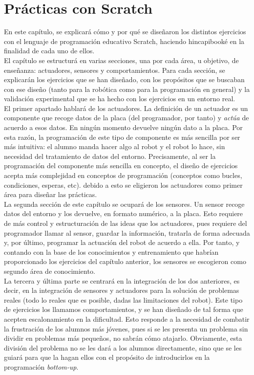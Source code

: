 \chapter{Prácticas con Scratch}
\label{cap:scratch}
En este capítulo, se explicará cómo y por qué se diseñaron los distintos ejercicios con el lenguaje de programación educativo Scratch, haciendo hincapibooké en la finalidad de cada uno de ellos. \\
El capítulo se estructurá en varias secciones, una por cada área, u objetivo, de enseñanza: actuadores, sensores y comportamientos. Para cada sección, se explicarán los ejercicios que se han diseñado, con los propósitos que se buscaban con ese diseño (tanto para la robótica como para la programación en general) y la validación experimental que se ha hecho con los ejercicios en un entorno real.\\
El primer apartado hablará de los actuadores. La definición de un actuador es un componente que recoge datos de la placa (del programador, por tanto) y \textit{actúa} de acuerdo a esos datos. En ningún momento devuelve ningún dato a la placa. Por esta razón, la programación de este tipo de componente es más sencilla por ser más intuitiva: el alumno manda hacer algo al robot y el robot lo hace, sin necesidad del tratamiento de datos del entorno. Precisamente, al ser la programación del componente más sencilla en concepto, el diseño de ejercicios acepta más complejidad en conceptos de programación (conceptos como bucles, condiciones, esperas, etc). debido a esto se eligieron los actuadores como primer área para diseñar las prácticas.\\
La segunda sección de este capítulo se ocupará de los sensores. Un sensor recoge datos del entorno y los devuelve, en formato numérico, a la placa. Esto requiere de más control y estructuración de las ideas que los actuadores, pues requiere del programador llamar al sensor, guardar la información, tratarla de forma adecuada y, por último, programar la actuación del robot de acuerdo a ella. Por tanto, y contando con la base de los conocimientos y entrenamiento que habrían proporcionado los ejercicios del capítulo anterior, los sensores se escogieron como segundo área de conocimiento.\\
La tercera y última parte se centrará en la integración de los dos anteriores, es decir, en la integración de sensores y actuadores para la solución de problemas reales (todo lo reales que es posible, dadas las limitaciones del robot). Este tipo de ejercicios los llamamos comportamientos, y se han diseñado de tal forma que acepten escalonamiento en la dificultad. Esto responde a la necesidad de combatir la frustración de los alumnos más jóvenes, pues si se les presenta un problema sin dividir en problemas más pequeños, no sabrán cómo atajarlo. Obviamente, esta división del problema no se les dará a los alumnos directamente, sino que se les guiará para que la hagan ellos con el propósito de introducirlos en la programación \textit{bottom-up}.

